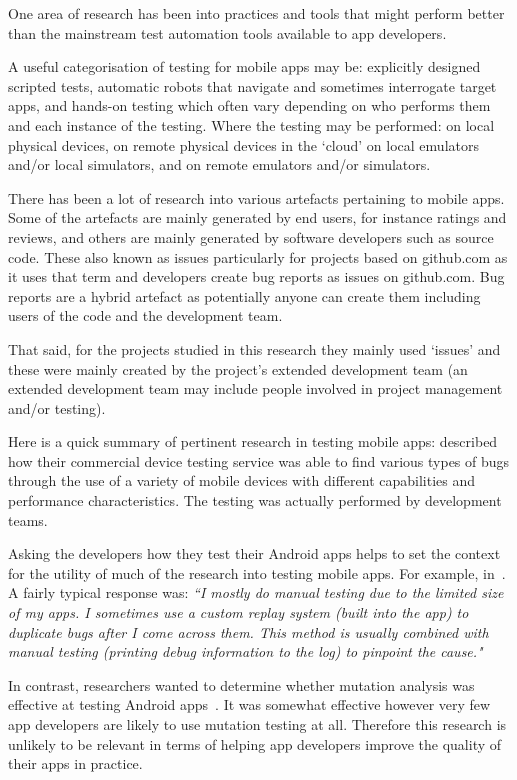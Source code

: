 One area of research has been into practices and tools that might perform better than the mainstream test automation tools available to app developers.

A useful categorisation of testing for mobile apps may be: 
explicitly designed scripted tests, 
automatic robots that navigate and sometimes interrogate target apps, and 
hands-on testing which often vary depending on who performs them and each instance of the testing. 
Where the testing may be performed:
on local physical devices,
on remote physical devices in the `cloud'
on local emulators and/or local simulators, and
on remote emulators and/or simulators.

There has been a lot of research into various artefacts pertaining to mobile apps. Some of the artefacts are mainly generated by end users, for instance ratings and reviews, and others are mainly generated by software developers such as source code. These also known as issues particularly for projects based on github.com as it uses that term and developers create bug reports as issues on github.com. Bug reports are a hybrid artefact as potentially anyone can create them including users of the code and the development team. 

That said, for the projects studied in this research they mainly used `issues' and these were mainly created by the project's extended development team (an extended development team may include people involved in project management and/or testing).

Here is a quick summary of pertinent research in testing mobile apps: \citeauthor{kaasila2012_testdroid_etc} described how their commercial device testing service was able to find various types of bugs through the use of a variety of mobile devices with different capabilities and performance characteristics. The testing was actually performed by development teams.

Asking the developers how they test their Android apps helps to set the context for the utility of much of the research into testing mobile apps. For example, in~. A fairly typical response was: \emph{``I mostly do manual testing due to the limited size of my apps. I sometimes use a custom replay system (built into the app) to duplicate bugs after I come across them. This method is usually combined with manual testing (printing debug information to the log) to pinpoint the cause."}
    
In contrast, researchers wanted to determine whether mutation analysis was effective at testing Android apps~. It was somewhat effective however very few app developers are likely to use mutation testing at all. Therefore this research is unlikely to be relevant in terms of helping app developers improve the quality of their apps in practice.


